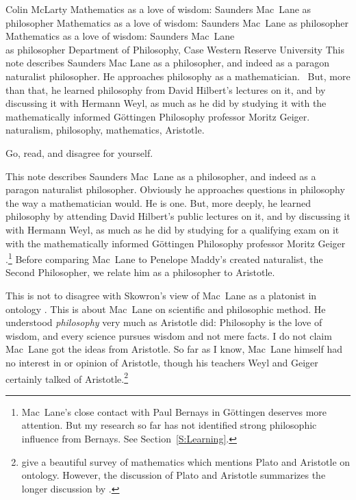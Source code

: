\begin{artengenv}{Colin McLarty}
	{Mathematics as a love of wisdom: Saunders Mac~Lane as philosopher}
	{Mathematics as a love of wisdom: Saunders Mac~Lane as philosopher}
	{Mathematics as a love of wisdom: Saunders Mac~Lane\\as philosopher}
	{Department of Philosophy, Case Western Reserve University}
	{This note describes Saunders Mac Lane as a philosopher, and indeed as a paragon naturalist philosopher. He approaches philosophy as a mathematician.  But, more than that, he learned philosophy from David Hilbert's lectures on it, and by discussing it with Hermann Weyl, as much as he did by studying it with the mathematically informed Göttingen Philosophy professor Moritz Geiger.}
	{naturalism, philosophy, mathematics, Aristotle.}


\vspace{3ex}
\begin{flushright}
  Go, read, and disagree for yourself.\\\parencite[p.390]{MacLBell46}
\end{flushright}\vspace{3ex}

\lettrine[loversize=0.13,lines=2,lraise=-0.03,nindent=0em,findent=0.2pt]%
{T}{}his note describes Saunders Mac~Lane as a philosopher, and indeed as a paragon naturalist philosopher. Obviously he approaches questions in philosophy the way a mathematician would.  He is one.  But, more deeply, he learned philosophy by attending David Hilbert's public lectures on it, and by discussing it with Hermann Weyl, as much as he did by studying for a qualifying exam on it with the mathematically informed G\"ottingen Philosophy professor Moritz Geiger \parencite{McLSaundersLast,McLSaundersReck}.\footnote{Mac~Lane's close contact with Paul Bernays in G\"ottingen deserves more attention.  But my research so far has not identified strong philosophic influence from Bernays.  See Section~\ref{S:Learning}.}  Before comparing Mac~Lane to Penelope Maddy's created naturalist, the Second Philosopher, we relate him as a philosopher to Aristotle.


This is not to disagree with Skowron's view of Mac~Lane as a platonist in ontology \parencite{SkowTalk}.  This is about Mac~Lane on scientific and philosophic method.  He understood \textit{philosophy} very much as Aristotle did: Philosophy is the love of wisdom, and every science pursues wisdom and not mere facts.  I do not claim Mac~Lane got the ideas from Aristotle.  So far as I know, Mac~Lane himself had no interest in or opinion of Aristotle, though his teachers Weyl and Geiger certainly talked of Aristotle.\footnote{\textcite{BrowderMacL} give a beautiful survey of mathematics which mentions Plato and Aristotle on ontology.  However, the discussion of Plato and Aristotle summarizes the longer discussion by \textcite{BrowderRel}.}




\end{artengenv}
